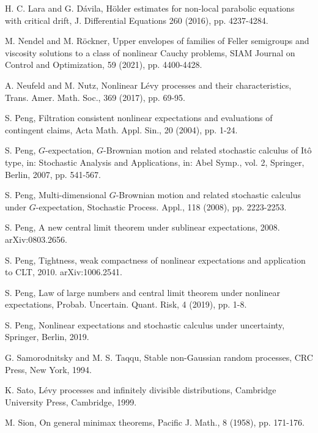 \documentclass[a4paper,oneside,10pt]{article}%
\numberwithin{equation}{section}
\begin{document}
\begin{thebibliography}{99}
H. C. Lara and G. D\'{a}vila, H\"{o}lder estimates for
non-local parabolic equations with critical drift, J. Differential Equations
260 (2016), pp. 4237-4284.

M. Nendel and M. R\"{o}ckner, Upper envelopes of families of
Feller semigroups and viscosity solutions to a class of nonlinear Cauchy
problems, SIAM Journal on Control and Optimization, 59 (2021), pp. 4400-4428.

A. Neufeld and M. Nutz, Nonlinear L\'{e}vy processes and
their characteristics, Trans. Amer. Math. Soc., 369 (2017), pp. 69-95.

S. Peng, Filtration consistent nonlinear expectations and
evaluations of contingent claims, Acta Math. Appl. Sin., 20 (2004), pp. 1-24.

S. Peng, $G$-expectation, $G$-Brownian motion and related
stochastic calculus of It\^{o} type, in: Stochastic Analysis and Applications,
in: Abel Symp., vol. 2, Springer, Berlin, 2007, pp. 541-567.

S. Peng, Multi-dimensional $G$-Brownian motion and related
stochastic calculus under $G$-expectation, Stochastic Process. Appl., 118
(2008), pp. 2223-2253.

S. Peng, A new central limit theorem under sublinear
expectations, 2008. arXiv:0803.2656.

S. Peng, Tightness, weak compactness of nonlinear
expectations and application to CLT, 2010. arXiv:1006.2541.

S. Peng, Law of large numbers and central limit theorem under
nonlinear expectations, Probab. Uncertain. Quant. Risk, 4 (2019), pp. 1-8.

S. Peng, Nonlinear expectations and stochastic calculus under
uncertainty, Springer, Berlin, 2019.

G. Samorodnitsky and M. S. Taqqu, Stable non-Gaussian random
processes, CRC Press, New York, 1994.

K. Sato, L\'{e}vy processes and infinitely divisible
distributions, Cambridge University Press, Cambridge, 1999.



M. Sion, On general minimax theorems, Pacific J. Math., 8
(1958), pp. 171-176.


\end{thebibliography}
\end{document}
